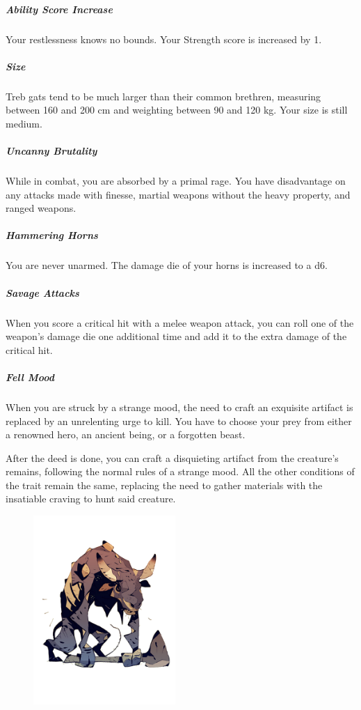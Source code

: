     \subparagraph{Ability Score Increase} Your restlessness knows no bounds.
    Your Strength score is increased by 1.

    \subparagraph{Size} Treb gats tend to be much larger than their common brethren, measuring between 160 and 200 cm and weighting between 90 and 120 kg.
    Your size is still medium.

    \subparagraph{Uncanny Brutality} While in combat, you are absorbed by a primal rage.
    You have disadvantage on any attacks made with finesse, martial weapons without the heavy property, and ranged weapons.

    \subparagraph{Hammering Horns} You are never unarmed.
    The damage die of your horns is increased to a d6.

    \subparagraph{Savage Attacks} When you score a critical hit with a melee weapon attack, you can roll one of the weapon's damage die one additional time and add it to the extra damage of the critical hit.

    \subparagraph{Fell Mood} When you are struck by a strange mood, the need to craft an exquisite artifact is replaced by an unrelenting urge to kill.
    You have to choose your prey from either a renowned hero, an ancient being, or a forgotten beast.

    After the deed is done, you can craft a disquieting artifact from the creature's remains, following the normal rules of a strange mood.
    All the other conditions of the trait remain the same, replacing the need to gather materials with the insatiable craving to hunt said creature.

\begin{figure}[!b]
    \centering
    \includegraphics[width=0.48\textwidth]{04kins/img/11gat_treb.png}
\end{figure}

\newpage

